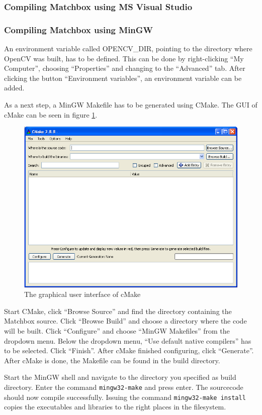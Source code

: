 \subsubsection{Compiling Matchbox using MS Visual Studio}

\subsubsection{Compiling Matchbox using MinGW}

An environment variable called OPENCV\_DIR, pointing to the 
directory where OpenCV was built, has to be defined. 
This can be done by right-clicking ``My Computer'', choosing 
``Properties'' and changing to the ``Advanced'' tab. After
clicking the button ``Environment variables'', an environment 
variable can be added.

As a next step, a MinGW Makefile has to be generated using CMake.
The GUI of cMake can be seen in figure \ref{fig:cmake}.
\begin{figure}[htpb]
	\centering
	\includegraphics[width=\textwidth]{img/cmakegui}
	\caption{The graphical user interface of cMake}
	\label{fig:cmake}
\end{figure}
Start CMake, click ``Browse Source'' and find the directory containing
the Matchbox source. Click ``Browse Build'' and choose a directory
where the code will be built.
Click ``Configure'' and choose ``MinGW Makefiles'' from the dropdown menu.
Below the dropdown menu, ``Use default native compilers'' has
to be selected. Click ``Finish''. 
After cMake finished configuring, click
``Generate''. After cMake is done, the Makefile can be found in the
build directory.

Start the MinGW shell and navigate to the directory you specified as
build directory. Enter the command \verb+mingw32-make+ and press enter.
The sourcecode should now compile successfully.
Issuing the command \verb+mingw32-make install+ copies the executables
and libraries to the right places in the filesystem.
